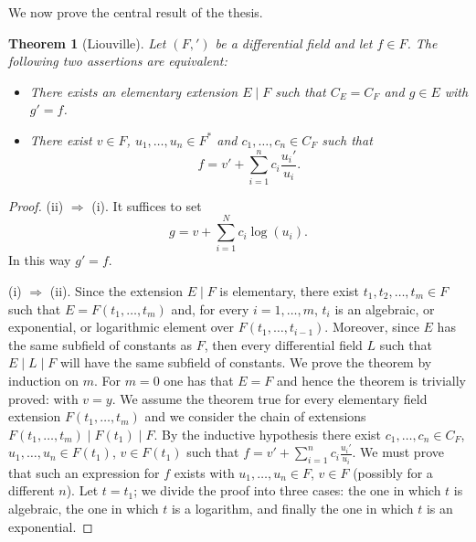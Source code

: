 \documentclass[11pt]{article}
\theoremstyle{plain}
\newtheorem{theorem}{Theorem}
\theoremstyle{definition}
\theoremstyle{remark}
\begin{document}
We now prove the central result of the thesis.

\begin{theorem}[Liouville]\label{thm:liouville}
Let $(F, ')$ be a differential field and let $f \in F$. The following
two assertions are equivalent:
\begin{itemize}
\item[(i)] There exists an elementary extension $E\mid F$ such that
$C_{E} = C_{F}$ and $g \in E$ with $g' = f$.
\item[(ii)] There exist $v \in F$, $u_{1}, \ldots, u_{n} \in F^{*}$ and
$c_{1}, \ldots, c_{n} \in C_{F}$ such that
\[
f = v' + \sum_{i=1}^{n} c_{i} \frac{u_{i}'}{u_{i}}.
\]
\end{itemize}
\end{theorem}

\begin{proof}
(ii) $\Rightarrow$ (i). It suffices to set
\[
g = v + \sum_{i=1}^{N} c_{i} \log(u_{i}).
\]
In this way $g' = f$.

(i) $\Rightarrow$ (ii). Since the extension $E\mid F$ is elementary,
there exist $t_{1}, t_{2}, \ldots, t_{m} \in F$ such that
$E = F(t_{1}, \ldots, t_{m})$ and, for every $i = 1, \ldots, m$, $t_{i}$
is an algebraic, or exponential, or logarithmic element over
$F(t_{1}, \ldots, t_{i-1})$. Moreover, since $E$ has the same subfield
of constants as $F$, then every differential field $L$ such that
$E\mid L\mid F$ will have the same subfield of constants. We prove the
theorem by induction on $m$. For $m = 0$ one has that $E = F$ and hence
the theorem is trivially proved: with $v = y$. We assume the theorem
true for every elementary field extension $F(t_{1}, \ldots, t_{m})$ and
we consider the chain of extensions
$F(t_{1}, \ldots, t_{m}) \mid F(t_{1}) \mid F$. By the inductive
hypothesis there exist $c_{1}, \ldots, c_{n} \in C_{F}$,
$u_{1}, \ldots, u_{n} \in F(t_{1})$, $v \in F(t_{1})$ such that
$f = v' + \sum_{i=1}^{n} c_{i} \frac{u_{i}'}{u_{i}}$. We must prove that
such an expression for $f$ exists with $u_{1}, \ldots, u_{n} \in F$,
$v \in F$ (possibly for a different $n$). Let $t = t_{1}$; we divide the
proof into three cases: the one in which $t$ is algebraic, the one in
which $t$ is a logarithm, and finally the one in which $t$ is an
exponential.


\end{proof}
\end{document}
